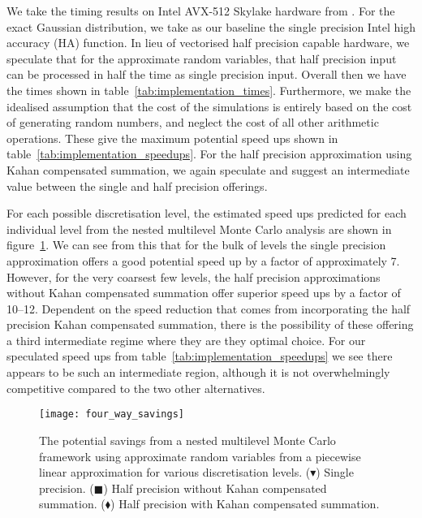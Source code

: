 \documentclass[9pt,a4paper,english]{extarticle}
\begin{document}
We take the timing results on Intel AVX-512 Skylake hardware from \citet{giles2020approximating}. For the exact Gaussian distribution, we take as our baseline the single precision Intel high accuracy (HA) function. In lieu of vectorised half precision capable hardware, we speculate that for the approximate random variables, that half precision input can be processed in half the time as single precision input. Overall then we have the times shown in table~\ref{tab:implementation_times}. Furthermore, we make the idealised assumption that the cost of the simulations is entirely based on the cost of generating random numbers, and neglect the cost of all other arithmetic operations. These give the maximum potential speed ups shown in table~\ref{tab:implementation_speedups}. For the half precision approximation using Kahan compensated summation, we again speculate and suggest an intermediate value between the single and half precision offerings. 

For each possible discretisation level, the estimated speed ups predicted for each individual level from the nested multilevel Monte Carlo analysis are shown in figure~\ref{fig:four_way_savings}. We can see from this that for the bulk of levels the single precision approximation offers a good potential speed up by a factor of approximately 7. However, for the very coarsest few levels, the half precision approximations without Kahan compensated summation offer superior speed ups by a factor of 10--12. Dependent on the speed reduction that comes from incorporating the half precision Kahan compensated summation, there is the possibility of these offering a third intermediate regime where they are they optimal choice. For our speculated speed ups from table~\ref{tab:implementation_speedups} we see there appears to be such an intermediate region, although it is not overwhelmingly competitive compared to the two other alternatives. 

\begin{figure}[htb]
\centering
\texttt{[image: four\_way\_savings]}

\caption{The potential savings from a nested multilevel Monte Carlo framework using approximate random variables from a piecewise linear approximation for various discretisation levels. ({\large $ \blacktriangledown $}) Single precision. ($ \blacksquare $) Half precision without Kahan compensated summation. ($ \blacklozenge $) Half precision with Kahan compensated summation.}
\label{fig:four_way_savings}
\end{figure}
\end{document}
